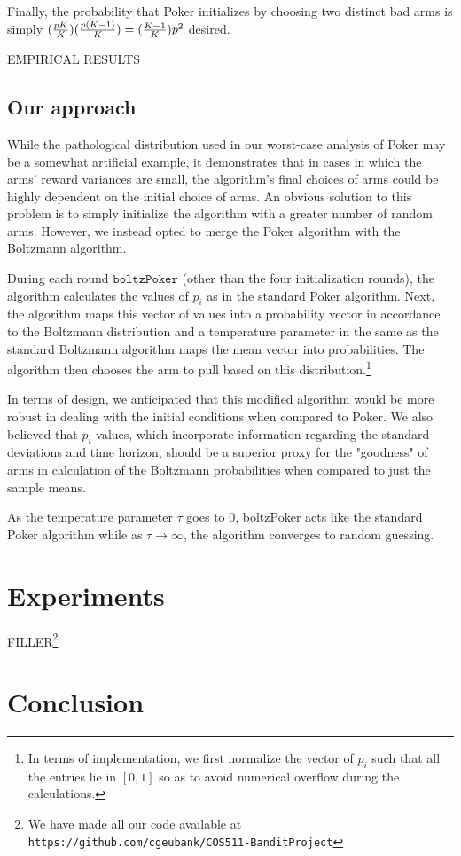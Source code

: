 \documentclass[12pt]{article}
\begin{document}
Finally, the probability that Poker initializes by choosing two distinct bad arms is simply $({pK\over{K}})({p(K-1)\over{K}}) = ({K-1\over K})p^{2}$ desired.

EMPIRICAL RESULTS

\subsection{Our approach}

While the pathological distribution used in our worst-case analysis of Poker may be a somewhat artificial example, it demonstrates that in cases in which the arms' reward variances are small, the algorithm's final choices of arms could be highly dependent  on the initial choice of arms. An obvious solution to this problem is to simply initialize the algorithm with a greater number of random arms. However, we instead opted to merge the Poker algorithm with the Boltzmann algorithm.

During each round $\texttt{boltzPoker}$ (other than the four initialization rounds), the algorithm calculates the values of $p_{i}$ as in the standard Poker algorithm. Next, the algorithm maps this vector of values into a probability vector in accordance to the Boltzmann distribution and a temperature parameter in the same as the standard Boltzmann algorithm maps the mean vector into probabilities. The algorithm then chooses the arm to pull based on this distribution.\footnote{In terms of implementation, we first normalize the vector of $p_{i}$ such that all the entries lie in $[0,1]$ so as to avoid numerical overflow during the calculations.}

In terms of design, we anticipated that this modified algorithm would be more robust in dealing with the initial conditions when compared to Poker. We also believed that $p_{i}$ values, which incorporate information regarding the standard deviations and time horizon, should be a superior proxy for the "goodness" of arms in calculation of the Boltzmann probabilities when compared to just the sample means.

As the temperature parameter $\tau$ goes to 0, boltzPoker acts like the standard Poker algorithm while as $\tau \to \infty$, the algorithm converges to random guessing.



\section{Experiments}

FILLER\footnote{We have made all our code available at \texttt{https://github.com/cgeubank/COS511-BanditProject}}

\section{Conclusion}



\end{document}
